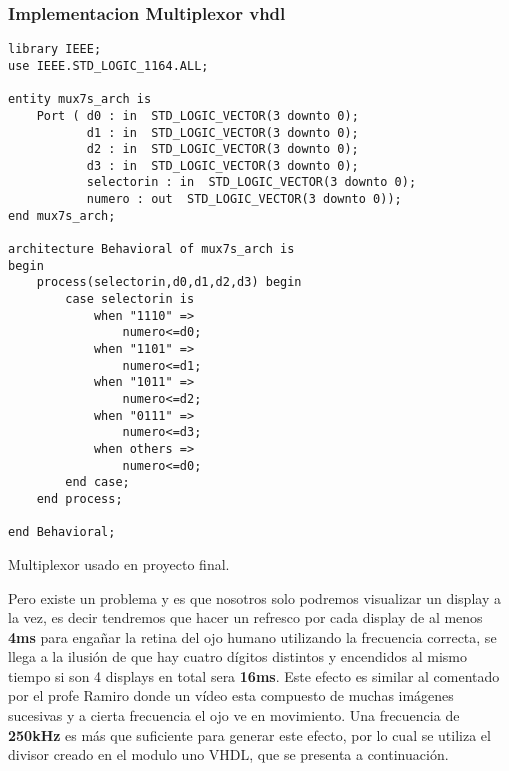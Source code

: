 \documentclass[a4paper]{article}
\begin{document}
\subsubsection{Implementacion Multiplexor vhdl}
\begin{listing}[H]
	\begin{verbatim}
library IEEE;
use IEEE.STD_LOGIC_1164.ALL;

entity mux7s_arch is
    Port ( d0 : in  STD_LOGIC_VECTOR(3 downto 0);
           d1 : in  STD_LOGIC_VECTOR(3 downto 0);
           d2 : in  STD_LOGIC_VECTOR(3 downto 0);
           d3 : in  STD_LOGIC_VECTOR(3 downto 0);
           selectorin : in  STD_LOGIC_VECTOR(3 downto 0);
           numero : out  STD_LOGIC_VECTOR(3 downto 0));
end mux7s_arch;

architecture Behavioral of mux7s_arch is
begin
	process(selectorin,d0,d1,d2,d3) begin
		case selectorin is
			when "1110" =>
				numero<=d0;
			when "1101" =>
				numero<=d1;
			when "1011" =>
				numero<=d2;
			when "0111" =>
				numero<=d3;
			when others =>
				numero<=d0;
		end case;
	end process;

end Behavioral;

\end{verbatim}
\caption{Multiplexor usado en proyecto final.}
    \label{mux}
\end{listing}

Pero existe un problema y es que nosotros solo podremos visualizar un display a la vez, es decir tendremos que hacer un refresco por cada display de al menos \textbf{4ms} para engañar la retina del ojo humano utilizando la frecuencia correcta, se llega a la ilusión de que hay cuatro dígitos distintos y encendidos al mismo tiempo si son 4 displays en total sera \textbf{16ms}. Este efecto es similar al comentado por el profe Ramiro donde un vídeo esta compuesto de muchas imágenes sucesivas y a cierta frecuencia el ojo ve en movimiento. Una frecuencia de \textbf{250kHz} es más que suficiente para generar este efecto, por lo cual se utiliza el divisor creado en el modulo uno VHDL, que se presenta a continuación. 
\end{document}
